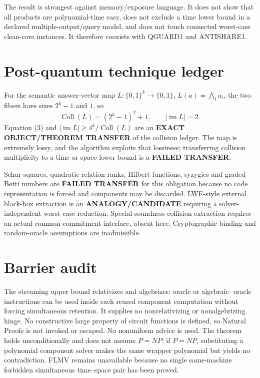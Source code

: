 \documentclass[11pt]{article}
\begin{document}
The result is strongest against memory/exposure language.  It does not show
that all products are polynomial-time easy, does not exclude a time lower
bound in a declared multiple-output/query model, and does not touch connected
worst-case clean-core instances.  It therefore coexists with QGUARD1 and
ANTISHARE1.

\section{Post-quantum technique ledger}

For the semantic answer-vector map
$L:\{0,1\}^k\to\{0,1\}$, $L(a)=\bigwedge_i a_i$, the two fibers have sizes
$2^k-1$ and $1$, so
\[
 \operatorname{Coll}(L)=(2^k-1)^2+1,
 \qquad |\operatorname{im}L|=2.                                \tag{3}
\]
Equation (3) and
$|\operatorname{im}L|\ge 4^k/\operatorname{Coll}(L)$ are an
\textbf{EXACT OBJECT/THEOREM TRANSFER} of the collision ledger.  The map is
extremely lossy, and the algorithm exploits that lossiness; transferring
collision multiplicity to a time or space lower bound is a
\textbf{FAILED TRANSFER}.

Schur squares, quadratic-relation ranks, Hilbert functions, syzygies and
graded Betti numbers are \textbf{FAILED TRANSFER} for this obligation because
no code representation is forced and components may be discarded.  LWE-style
external black-box extraction is an \textbf{ANALOGY/CANDIDATE} requiring a
solver-independent worst-case reduction.  Special-soundness collision
extraction requires an actual common-commitment interface, absent here.
Cryptographic binding and random-oracle assumptions are inadmissible.

\section{Barrier audit}

The streaming upper bound relativizes and algebrizes: oracle or algebraic-
oracle instructions can be used inside each reused component computation
without forcing simultaneous retention.  It supplies no nonrelativizing or
nonalgebrizing hinge.  No constructive large property of circuit functions is
defined, so Natural Proofs is not invoked or escaped.  No nonuniform advice
is used.  The theorem holds unconditionally and does not assume $P=NP$; if
$P=NP$, substituting a polynomial component solver makes the same wrapper
polynomial but yields no contradiction.  FLMV remains unavailable because no
single same-machine forbidden simultaneous time--space pair has been proved.
\end{document}
